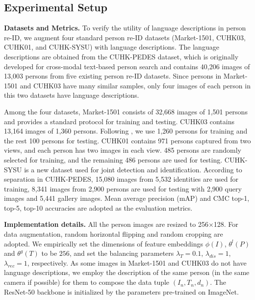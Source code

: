 \documentclass[runningheads]{llncs}
\begin{document}
\subsection{Experimental Setup} \label{Sec:Setup}



\noindent \textbf{Datasets and Metrics.} \quad  To verify the utility of language descriptions in person re-ID, we augment four standard person re-ID datasets (Market-1501, CUHK03, CUHK01, and CUHK-SYSU) with language descriptions. The language descriptions are obtained from the CUHK-PEDES  dataset, which is originally developed for cross-modal text-based person search and  contains 40,206 images of 13,003 persons from five existing person re-ID datasets. Since persons in Market-1501 and CUHK03 have many similar samples, only four images of each person in this two datasets have language descriptions. 

Among the four datasets, Market-1501 consists of 32,668 images of 1,501 persons and provides a standard protocol for training and testing.  CUHK03 contains 13,164 images of 1,360 persons. Following \cite{Li_2014_CVPR}, we use 1,260 persons for training and the rest 100 persons for testing. CUHK01 contains 971 persons captured from two views, and each person has two images in each view. 485 persons are randomly selected for training, and the remaining 486 persons are used for testing. CUHK-SYSU is a new dataset used for joint detection and identification. According to separation in CUHK-PEDES, 15,080 images from 5,532 identities are used for training, 8,341 images from 2,900 persons are used for testing with 2,900 query images and 5,441 gallery images. Mean average precision (mAP) and CMC top-1, top-5, top-10 accuracies are adopted as the evaluation metrics. 

\vspace{0.5em}

\noindent \textbf{Implementation details.}  All the person images are resized to 256$\times$128. For data augmentation, random horizontal flipping and random cropping are adopted. We empirically set the dimensions of feature embeddings $\phi(I)$, $\theta^{l}(P)$ and $\theta^{g}(T)$ to be $256$, and set the  balancing parameters $\lambda_{T}=0.1$, $ \lambda_{dis}=1$, $\lambda_{rec}=1$, respectively.  As some images in Market-1501 and CUHK03  do not have language descriptions, we employ the description of the same person (in the same camera if possible) for them to compose the data tuple $(I_{n}, T_{n}, d_{n})$. The ResNet-50 backbone is initialized by the parameters pre-trained on ImageNet\cite{imagenet_cvpr09}.
\end{document}
